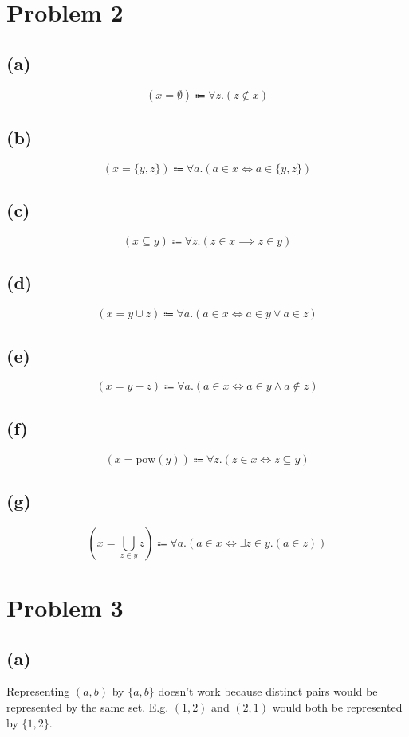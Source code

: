 \documentclass{article}
\begin{document}
\pagebreak

\section{Problem 2}

\subsection{(a)}
\[
	(x = \emptyset) \Coloneqq \forall z.(z \notin x)
\]

\subsection{(b)}
\[
	(x = \{y, z\}) \Coloneqq \forall a.(a \in x \iff a \in \{y, z\})
\]

\subsection{(c)}
\[
	(x \subseteq y) \Coloneqq \forall z.(z \in x \implies z \in y)
\]


\subsection{(d)}
\[
	(x = y \cup z) \Coloneqq \forall a.(a \in x \iff a \in y \lor a \in z)
\]

\subsection{(e)}
\[
	(x = y - z) \Coloneqq \forall a.(a \in x \iff a \in y \land a \notin z)
\]

\subsection{(f)}
\[
	(x = \text{pow}(y)) \Coloneqq \forall z.(z \in x \iff z \subseteq y)
\]

\subsection{(g)}
\[
	(x = \bigcup_{z \in y} z) \Coloneqq \forall a.(a \in x \iff \exists z \in y.(a \in z))
\]

\pagebreak

\section{Problem 3}

\subsection{(a)}
Representing $(a, b)$ by $\{a,b\}$ doesn't work because distinct pairs would be represented by the same set. E.g. $(1,2)$ and $(2,1)$ would both be represented by $\{1,2\}$.
\end{document}
